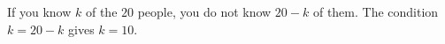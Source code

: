 If you know $k$ of the $20$ people, you do not know $20-k$ of them. The condition $k=20-k$ gives $k=\boxed{10}$.
